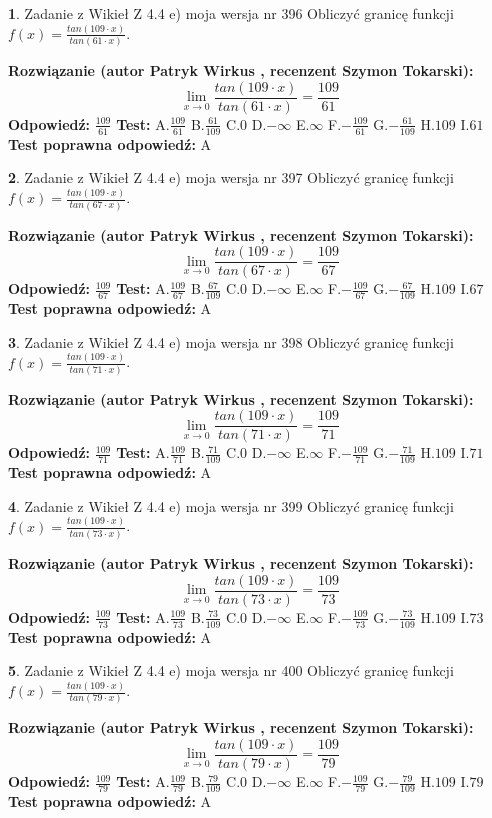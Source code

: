 \documentclass[12pt, a4paper]{article}
\theoremstyle{definition} %
\newtheorem{zad}{}
\newcommand{\zadStart}[1]{\begin{zad}#1\newline}
\newcommand{\zadStop}{\end{zad}}
\newcommand{\rozwStart}[2]{\noindent \textbf{Rozwiązanie (autor #1 , recenzent #2): }\newline}
\newcommand{\rozwStop}{\newline}
\newcommand{\odpStart}{\noindent \textbf{Odpowiedź:}\newline}
\newcommand{\odpStop}{\newline}
\newcommand{\testStart}{\noindent \textbf{Test:}\newline}
\newcommand{\testStop}{\newline}
\newcommand{\kluczStart}{\noindent \textbf{Test poprawna odpowiedź:}\newline}
\newcommand{\kluczStop}{\newline}
\begin{document}
\zadStart{Zadanie z Wikieł Z 4.4 e) moja wersja nr 396}
Obliczyć granicę funkcji $f(x)=\frac{tan(109\cdot x)}{tan(61\cdot x)}$.
\zadStop
\rozwStart{Patryk Wirkus}{Szymon Tokarski}
$$\lim\limits_{x\to 0}\frac{tan(109\cdot x)}{tan(61\cdot x)}=
\frac{109}{61}$$
\rozwStop
\odpStart
$\frac{109}{61}$
\odpStop
\testStart
A.$\frac{109}{61}$
B.$\frac{61}{109}$
C.$0$
D.$-\infty$
E.$\infty$
F.$-\frac{109}{61}$
G.$-\frac{61}{109}$
H.$109$
I.$61$
\testStop
\kluczStart
A
\kluczStop



\zadStart{Zadanie z Wikieł Z 4.4 e) moja wersja nr 397}
Obliczyć granicę funkcji $f(x)=\frac{tan(109\cdot x)}{tan(67\cdot x)}$.
\zadStop
\rozwStart{Patryk Wirkus}{Szymon Tokarski}
$$\lim\limits_{x\to 0}\frac{tan(109\cdot x)}{tan(67\cdot x)}=
\frac{109}{67}$$
\rozwStop
\odpStart
$\frac{109}{67}$
\odpStop
\testStart
A.$\frac{109}{67}$
B.$\frac{67}{109}$
C.$0$
D.$-\infty$
E.$\infty$
F.$-\frac{109}{67}$
G.$-\frac{67}{109}$
H.$109$
I.$67$
\testStop
\kluczStart
A
\kluczStop



\zadStart{Zadanie z Wikieł Z 4.4 e) moja wersja nr 398}
Obliczyć granicę funkcji $f(x)=\frac{tan(109\cdot x)}{tan(71\cdot x)}$.
\zadStop
\rozwStart{Patryk Wirkus}{Szymon Tokarski}
$$\lim\limits_{x\to 0}\frac{tan(109\cdot x)}{tan(71\cdot x)}=
\frac{109}{71}$$
\rozwStop
\odpStart
$\frac{109}{71}$
\odpStop
\testStart
A.$\frac{109}{71}$
B.$\frac{71}{109}$
C.$0$
D.$-\infty$
E.$\infty$
F.$-\frac{109}{71}$
G.$-\frac{71}{109}$
H.$109$
I.$71$
\testStop
\kluczStart
A
\kluczStop



\zadStart{Zadanie z Wikieł Z 4.4 e) moja wersja nr 399}
Obliczyć granicę funkcji $f(x)=\frac{tan(109\cdot x)}{tan(73\cdot x)}$.
\zadStop
\rozwStart{Patryk Wirkus}{Szymon Tokarski}
$$\lim\limits_{x\to 0}\frac{tan(109\cdot x)}{tan(73\cdot x)}=
\frac{109}{73}$$
\rozwStop
\odpStart
$\frac{109}{73}$
\odpStop
\testStart
A.$\frac{109}{73}$
B.$\frac{73}{109}$
C.$0$
D.$-\infty$
E.$\infty$
F.$-\frac{109}{73}$
G.$-\frac{73}{109}$
H.$109$
I.$73$
\testStop
\kluczStart
A
\kluczStop



\zadStart{Zadanie z Wikieł Z 4.4 e) moja wersja nr 400}
Obliczyć granicę funkcji $f(x)=\frac{tan(109\cdot x)}{tan(79\cdot x)}$.
\zadStop
\rozwStart{Patryk Wirkus}{Szymon Tokarski}
$$\lim\limits_{x\to 0}\frac{tan(109\cdot x)}{tan(79\cdot x)}=
\frac{109}{79}$$
\rozwStop
\odpStart
$\frac{109}{79}$
\odpStop
\testStart
A.$\frac{109}{79}$
B.$\frac{79}{109}$
C.$0$
D.$-\infty$
E.$\infty$
F.$-\frac{109}{79}$
G.$-\frac{79}{109}$
H.$109$
I.$79$
\testStop
\kluczStart
A
\kluczStop
\end{document}
